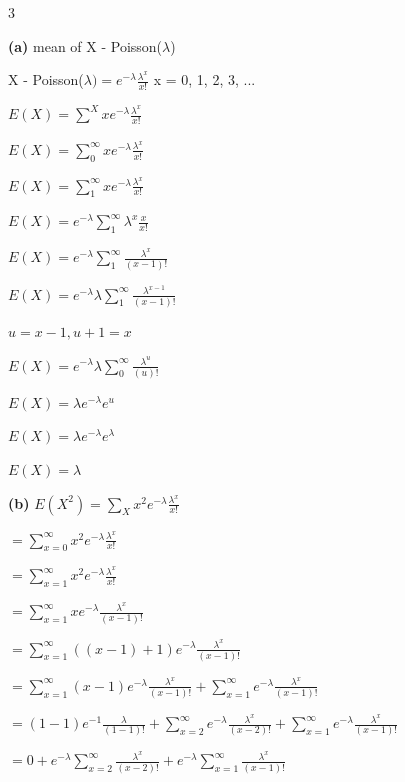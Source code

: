 \documentclass[12 pt]{article}
\begin{document}
    \begin{exercise}{3}
    \hfill

    \textbf{(a)} mean of X - Poisson($\lambda$)

    X - Poisson($\lambda) = e^{-\lambda} \frac{\lambda^x}{x!}$ x = 0, 1, 2, 3, ...

    $E(X) = \sum_{}^{X} x e^{-\lambda} \frac{\lambda^x}{x!}$

    $E(X) = \sum_{0}^{\infty} x e^{-\lambda} \frac{\lambda^x}{x!}$

     $E(X) = \sum_{1}^{\infty} x e^{-\lambda} \frac{\lambda^x}{x!}$

     $E(X) = e^{-\lambda} \sum_{1}^{\infty} \lambda^x \frac{x}{x!}$

     $E(X) = e^{-\lambda} \sum_{1}^{\infty} \frac{\lambda^x}{(x-1)!}$

     $E(X) = e^{-\lambda} \lambda \sum_{1}^{\infty} \frac{\lambda^{x-1}}{(x-1)!}$

     \hfill

     $u = x - 1, u + 1 = x$

     \hfill

     $E(X) = e^{-\lambda} \lambda \sum_{0}^{\infty} \frac{\lambda^{u}}{(u)!}$

     $E(X) = \lambda e^{- \lambda} e^u$

     $E(X) = \lambda e^{- \lambda} e^{\lambda}$

     $E(X) = \lambda$

    \hfill

    \textbf{(b)} $E(X^2) = \sum_{X}^{} x^2 e^{- \lambda} \frac{\lambda^x}{x!}$

    $= \sum_{x = 0}^{\infty} x^2 e^{- \lambda} \frac{\lambda^x}{x!}$

    $= \sum_{x = 1}^{\infty} x^2 e^{- \lambda} \frac{\lambda^x}{x!}$

    $= \sum_{x = 1}^{\infty} x e^{- \lambda} \frac{\lambda^x}{(x - 1)!}$

    $= \sum_{x = 1}^{\infty} ((x-1)+1) e^{- \lambda} \frac{\lambda^x}{(x - 1)!}$

    $= \sum_{x = 1}^{\infty} (x-1) e^{- \lambda} \frac{\lambda^x}{(x - 1)!} + \sum_{x = 1}^{\infty} e^{- \lambda} \frac{\lambda^x}{(x - 1)!}$

    $= (1-1)e^{-1} \frac{\lambda}{(1-1)!} + \sum_{x = 2}^{\infty} e^{- \lambda} \frac{\lambda^x}{(x - 2)!} + \sum_{x = 1}^{\infty} e^{- \lambda} \frac{\lambda^x}{(x - 1)!}$

    $= 0 + e^{- \lambda} \sum_{x = 2}^{\infty} \frac{\lambda^x}{(x - 2)!} + e^{- \lambda} \sum_{x = 1}^{\infty} \frac{\lambda^x}{(x - 1)!}$


\end{exercise}
\end{document}
